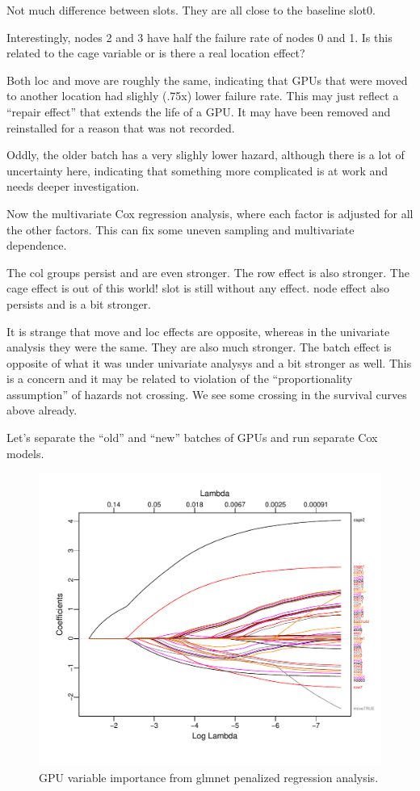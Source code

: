 Not much difference between slots. They are all close to the baseline
slot0.

Interestingly, nodes 2 and 3 have half the failure rate of nodes 0 and
1. Is this related to the cage variable or is there a real location
effect?

Both loc and move are roughly the same, indicating that GPUs that were
moved to another location had slighly (.75x) lower failure rate. This
may just reflect a “repair effect” that extends the life of a GPU. It
may have been removed and reinstalled for a reason that was not
recorded. 
 
Oddly, the older batch has a very slighly lower hazard, although there
is a lot of uncertainty here, indicating that something more
complicated is at work and needs deeper investigation. 

Now the multivariate Cox regression analysis, where each factor is
adjusted for all the other factors. This can fix some uneven sampling
and multivariate dependence. 

The col groups persist and are even stronger. The row effect is also
stronger. The cage effect is out of this world! slot is still without
any effect. node effect also persists and is a bit stronger. 

It is strange that move and loc effects are opposite, whereas in the
univariate analysis they were the same. They are also much
stronger. The batch effect is opposite of what it was under univariate
analysys and a bit stronger as well. This is a concern and it may be
related to violation of the “proportionality assumption” of hazards
not crossing. We see some crossing in the survival curves above
already. 

Let’s separate the “old” and “new” batches of GPUs and run separate
Cox models. 





\begin{figure}
  \includegraphics[width=5in]{glmnet.pdf}
  \caption{GPU variable importance from glmnet penalized regression analysis.}
\end{figure}
